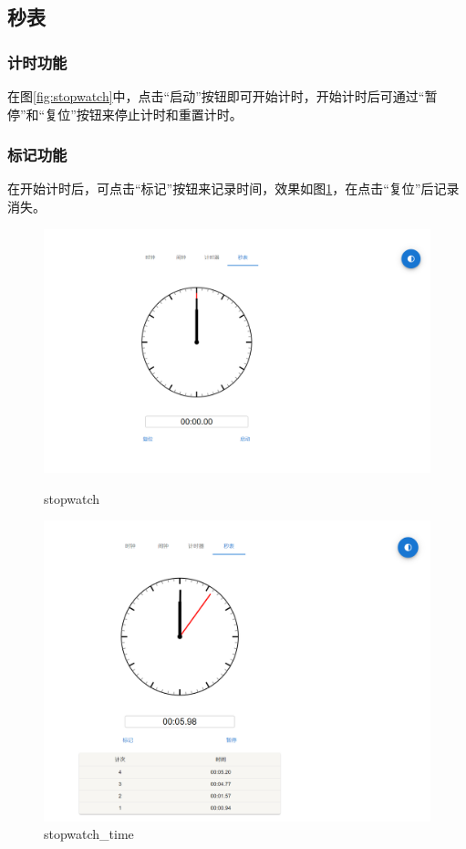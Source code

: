 \documentclass[a4paper,11pt]{article}
\begin{document}
\subsection{秒表}
\subsubsection{计时功能}
在图\ref{fig:stopwatch}中，点击“启动”按钮即可开始计时，开始计时后可通过“暂停”和“复位”按钮来停止计时和重置计时。
\subsubsection{标记功能}
在开始计时后，可点击“标记”按钮来记录时间，效果如图\ref{fig:stopwatch_time}，在点击“复位”后记录消失。

\begin{figure}[!h]
    \centering
    \begin{minipage}{0.48\textwidth}
        \centering
        \includegraphics[width=\linewidth]{image/stopwatch.png}
        \caption{stopwatch}
            \label{fig:stopwatch}
    \end{minipage}\hfill
    \begin{minipage}{0.48\textwidth}
        \centering
        \includegraphics[width=\linewidth]{image/stopwatch_time.png}
        \caption{stopwatch\_time}
        \label{fig:stopwatch_time}
    \end{minipage}
\end{figure}
\end{document}
